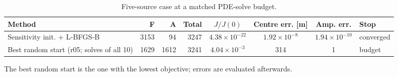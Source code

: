 \begin{table}[htbp]
\centering
\caption{Five-source case at a matched PDE-solve budget.}
\label{tab:table_budget_comparison}
\footnotesize
\begin{tabular}{lrrrcccl}
\toprule
Method & F & A & Total & $J/J(0)$ & Centre err. [m] & Amp. err. & Stop \\
\midrule
Sensitivity init. + L-BFGS-B & 3153 & 94 & 3247 & $4.38\times 10^{-22}$ & $1.92\times 10^{-8}$ & $1.94\times 10^{-10}$ & converged \\
Best random start (r05; solves of all 10) & 1629 & 1612 & 3241 & $4.04\times 10^{-3}$ & 314 & 1 & budget \\
\bottomrule
\end{tabular}
\par\smallskip
\parbox{0.92\linewidth}{\scriptsize The best random start is the one with the lowest objective; errors are evaluated afterwards.}
\end{table}
